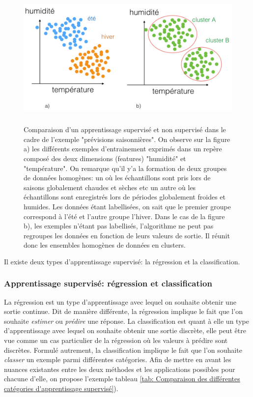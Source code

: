 \begin{figure}[h]
	\centering\includegraphics[height=7cm]{images/apprentissage_meteo.jpeg}
	\caption[Comparaison d'un apprentissage supervisé et non supervisé dans le cadre de l'exemple "prévisions saisonnières"]{Comparaison d'un apprentissage supervisé et non supervisé dans le cadre de l'exemple "prévisions saisonnières". On observe sur la figure a) les différents exemples d'entrainement exprimés dans un repère composé des deux dimensions (features) "humidité" et "température". On remarque qu'il y'a la formation de deux groupes de données homogènes: un où les échantillons sont pris lors de saisons globalement chaudes et sèches etc un autre où les échantillons sont enregistrés lors de périodes globalement froides et humides. Les données étant labellisées, on sait que le premier groupe correspond à l'été et l'autre groupe l'hiver. Dans le cas de la figure b), les exemples n'étant pas labellisés, l'algorithme ne peut pas regroupes les données en fonction de leurs valeurs de sortie. Il réunit donc les ensembles homogènes de données en clusters.}
	\label{fig:Comparaison d'un apprentissage supervisé et non supervisé dans le cadre de l'exemple prévision saisonnières}
\end{figure}

Il existe deux types d'apprentissage supervisé: la régression et la classification.


\subsubsection{Apprentissage supervisé: régression et classification} 
\label{Le Machine Learning: Généralités sur le Machine Learning: Le modèle:Regression et classification}
 La régression est un type d'apprentissage avec lequel on souhaite obtenir une sortie continue. Dit de manière différente, la régression implique le fait que l'on souhaite \emph{estimer} ou \emph{prédire} une réponse. La classification est quant à elle un type d'apprentissage avec lequel on souhaite obtenir une sortie discrète, elle peut être vue comme un cas particulier de la régression où les valeurs à prédire sont discrètes. Formulé autrement, la classification implique le fait que l'on souhaite \emph{classer} un exemple parmi différentes catégories. Afin de mettre en avant les nuances existantes entre les deux méthodes et les applications possibles pour chacune d'elle, on propose l'exemple tableau \ref {tab: Comparaison des différentes catégories d'apprentissage supervisé}).

